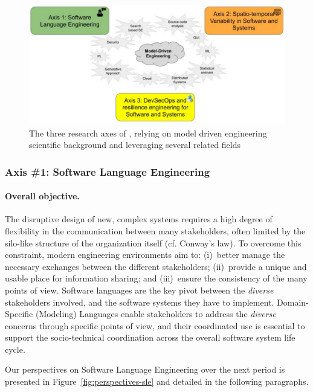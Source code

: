 \begin{figure}[h]
\centering
\includegraphics[width=0.7\columnwidth]{IMG/perspectives.pdf}
\caption{The three research axes of \team{}, relying on model driven engineering scientific background and leveraging several related fields}
\label{fig:perspectives}
\end{figure}

	
		\subsubsection{Axis \#1: Software Language Engineering} \label{sec:future-axis1-SLE}
		

\paragraph{Overall objective.} The disruptive design of new, complex systems requires a high degree of flexibility in the communication between many stakeholders, often limited by the silo-like structure of the organization itself (cf. Conway’s law). To overcome this constraint, modern engineering environments aim to: (i)~better manage the necessary exchanges between the different stakeholders; (ii)~provide a unique and usable place for information sharing; and (iii)~ensure the consistency of the many points of view. 
Software languages are the key pivot between the \emph{diverse} stakeholders involved, and the software systems they have to implement. 
Domain-Specific (Modeling) Languages enable stakeholders to address the \emph{diverse} concerns through specific points of view, and their coordinated use is essential to support the socio-technical coordination across the overall software system life cycle. 


Our perspectives on Software Language Engineering over the next period is presented in Figure~\ref{fig:perspectives-sle} and detailed in the following paragraphs.

